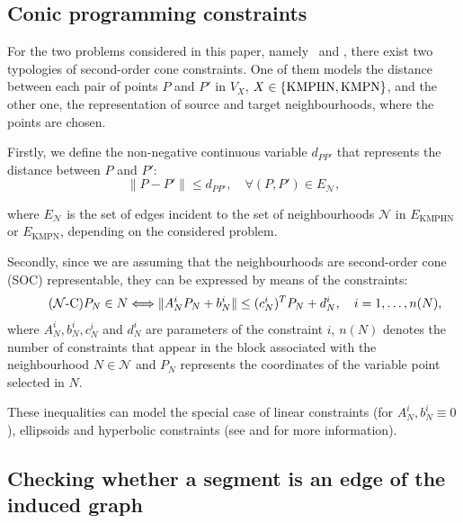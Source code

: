 \documentclass[a4paper,  review, authoryear, 1p.]{elsarticle}
\newcommand{\KMPHN}{{\sf{H-KMPHN}}}
\newcommand{\KMPN}{{\sf{H-KMPN}\xspace }}
\newcommand{\EN}{{E^{}_{\mathcal N}}}
\newcommand{\EKMPHN}{{E_{\text{KMPHN}}}}
\newcommand{\EKMPN}{{E_{\text{KMPN}}}}
\newcommand{\CV}[1]{{\color{blue}#1}}
\begin{document}
	\subsection{Conic programming constraints}\label{subsection:conic}
	For the two problems considered in this paper,  namely \KMPHN \ and \KMPN, there exist two typologies of second-order cone constraints. One of them models the distance between each pair of points $P$ and $P'$ in $V_X$, $X\in\{\rm KMPHN, \rm KMPN\}$, and the other one, the representation of source and target neighbourhoods, where the points are chosen.
	
	\newcommand{\dvar}[2]{d_{#1#2}}
	
	Firstly, we define the non-negative continuous variable $\dvar{P}{P'}$ that represents the distance between $P$ and $P'$:
	\begin{equation*}\tag{$d$-C}\label{eq:dC}
		\|P - P'\|\leq \dvar{P}{P'},\quad\forall (P,P')\in \EN,
	\end{equation*}
	
	\CV{where $\EN$ is the set of edges incident to the set of neighbourhoods $\mathcal N$ in $\EKMPHN$ or $\EKMPN$}, depending on the considered problem.
	
	Secondly, since we are assuming that the neighbourhoods are second-order cone (SOC) representable, they can be expressed by means of the constraints:
	\begin{equation*}\tag{$\mathcal N$-C}\label{eq:nC}
		P_N\in N \Longleftrightarrow
		\|A_N^i P_N + b_N^i\| \leq (c_N^i)^T P_N + d_N^i,\quad i=1,\ldots,n(N), \\
	\end{equation*}
	where $A_N^i, b_N^i, c_N^i$ and $d_N^i$ are parameters of the constraint $i$, $n(N)$ denotes the number of constraints that appear in the block associated with the neighbourhood $N\in \mathcal N$ \CV{and $P_N$ represents the coordinates of the variable point selected in $N$.} 
	
	These inequalities can model the special case of linear constraints (for $A_N^{i}, b_N^i\equiv 0$), ellipsoids and hyperbolic constraints (see \citet{lobo1998} and \citet{boyd2004} for more information).
	
	\subsection{Checking whether a segment is an edge of the induced graph}
	
\end{document}

